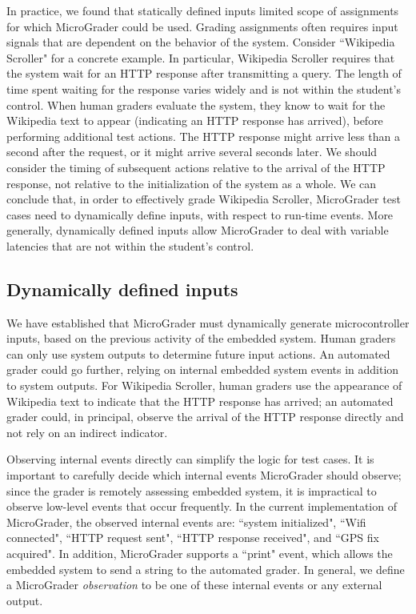 \documentclass[12pt]{article}
\begin{document}
In practice, we found that statically defined inputs limited scope of assignments for which MicroGrader could be used.  Grading assignments often requires input signals that are dependent on the behavior of the system.  Consider ``Wikipedia Scroller" for a concrete example.  In particular, Wikipedia Scroller requires that the system wait for an HTTP response after transmitting a query.  The length of time spent waiting for the response varies widely and is not within the student's control.  When human graders evaluate the system, they know to wait for the Wikipedia text to appear (indicating an HTTP response has arrived), before performing additional test actions.  The HTTP response might arrive less than a second after the request, or it might arrive several seconds later.  We should consider the timing of subsequent actions relative to the arrival of the HTTP response, not relative to the initialization of the system as a whole.  We can conclude that, in order to effectively grade Wikipedia Scroller, MicroGrader test cases need to dynamically define inputs, with respect to run-time events.  More generally, dynamically defined inputs allow MicroGrader to deal with variable latencies that are not within the student's control.

\subsection{Dynamically defined inputs}
We have established that MicroGrader must dynamically generate microcontroller inputs, based on the previous activity of the embedded system.  Human graders can only use system outputs to determine future input actions.  An automated grader could go further, relying on internal embedded system events in addition to system outputs.  For Wikipedia Scroller, human graders use the appearance of Wikipedia text to indicate that the HTTP response has arrived; an automated grader could, in principal, observe the arrival of the HTTP response directly and not rely on an indirect indicator.

Observing internal events directly can simplify the logic for test cases.  It is important to carefully decide which internal events MicroGrader should observe; since the grader is remotely assessing embedded system, it is impractical to observe low-level events that occur frequently.  In the current implementation of MicroGrader, the observed internal events are: ``system initialized", ``Wifi connected", ``HTTP request sent", ``HTTP response received", and ``GPS fix acquired".  In addition, MicroGrader supports a ``print" event, which allows the embedded system to send a string to the automated grader.  In general, we define a MicroGrader \textit{observation} to be one of these internal events or any external output.
\end{document}
